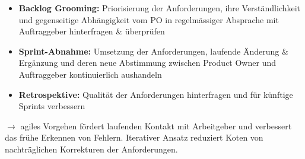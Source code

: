 \documentclass[a4paper]{article}
\begin{document}
		\begin{itemize}
			\item \textbf{Backlog Grooming:}
			Priorisierung der Anforderungen, ihre Verständlichkeit und gegenseitige Abhängigkeit vom PO in regelmässiger Absprache mit Auftraggeber hinterfragen \& überprüfen
			\item \textbf{Sprint-Abnahme:}
			Umsetzung der Anforderungen, laufende Änderung \& Ergänzung und deren neue Abstimmung zwischen Product Owner und Auftraggeber kontinuierlich aushandeln
			\item \textbf{Retrospektive:}
			Qualität der Anforderungen hinterfragen und für künftige Sprints verbessern
		\end{itemize}
		$\rightarrow$ agiles Vorgehen fördert laufenden Kontakt mit Arbeitgeber und verbessert das frühe Erkennen von Fehlern.
		Iterativer Ansatz reduziert Koten von nachträglichen Korrekturen der Anforderungen.
	
\end{document}
